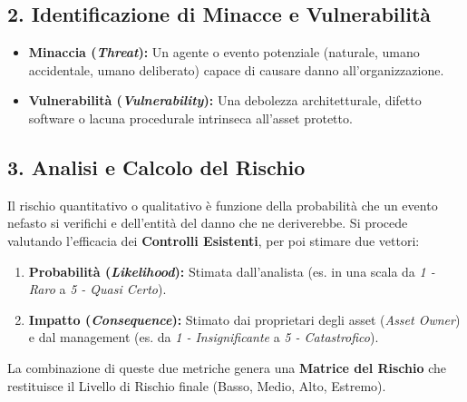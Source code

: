 \subsection{2. Identificazione di Minacce e Vulnerabilità}
\begin{defbox}
\begin{itemize}
    \item \textbf{Minaccia (\textit{Threat}):} Un agente o evento potenziale (naturale, umano accidentale, umano deliberato) capace di causare danno all'organizzazione.
    \item \textbf{Vulnerabilità (\textit{Vulnerability}):} Una debolezza architetturale, difetto software o lacuna procedurale intrinseca all'asset protetto.
\end{itemize}
\end{defbox}

\subsection{3. Analisi e Calcolo del Rischio}
Il rischio quantitativo o qualitativo è funzione della probabilità che un evento nefasto si verifichi e dell'entità del danno che ne deriverebbe.
Si procede valutando l'efficacia dei \textbf{Controlli Esistenti}, per poi stimare due vettori:
\begin{enumerate}
    \item \textbf{Probabilità (\textit{Likelihood}):} Stimata dall'analista (es. in una scala da \textit{1 - Raro} a \textit{5 - Quasi Certo}).
    \item \textbf{Impatto (\textit{Consequence}):} Stimato dai proprietari degli asset (\textit{Asset Owner}) e dal management (es. da \textit{1 - Insignificante} a \textit{5 - Catastrofico}).
\end{enumerate}

La combinazione di queste due metriche genera una \textbf{Matrice del Rischio} che restituisce il Livello di Rischio finale (Basso, Medio, Alto, Estremo).


